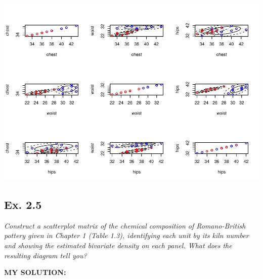 \documentclass[
]{article}
\begin{document}
\includegraphics[width=1\linewidth,height=2\textheight]{HUDM6122-Homework_02-Chenguang-Pan_files/figure-latex/unnamed-chunk-6-1}

\hypertarget{ex.-2.5}{%
\subsection{Ex. 2.5}\label{ex.-2.5}}

\emph{Construct a scatterplot matrix of the chemical composition of
Romano-British pottery given in Chapter 1 (Table 1.3), identifying each
unit by its kiln number and showing the estimated bivariate density on
each panel. What does the resulting diagram tell you?}

\textbf{MY SOLUTION:}
\end{document}
